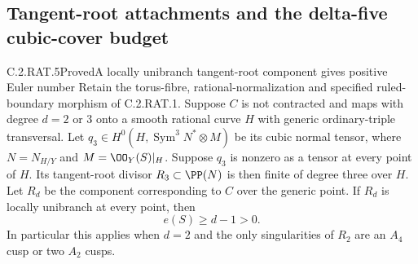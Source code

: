 \subsection{Tangent-root attachments and the delta-five cubic-cover budget}

\begin{statement}{C.2.RAT.5}{Proved}{A locally unibranch tangent-root component gives positive Euler number}
Retain the torus-fibre, rational-normalization and specified
ruled-boundary morphism of C.2.RAT.1. Suppose $C$ is not
contracted and maps with degree $d=2$ or $3$ onto a smooth
rational curve $H$ with generic ordinary-triple transversal.
Let $q_3\in H^0(H,\operatorname{Sym}^3N^*\otimes M)$ be
its cubic normal tensor, where $N=N_{H/Y}$ and
$M=\OO_Y(S)|_H$. Suppose $q_3$ is nonzero as a tensor at
every point of $H$. Its tangent-root divisor
$R_3\subset\PP(N)$ is then finite of degree three over $H$.
Let $R_d$ be the component corresponding to $C$ over the
generic point. If $R_d$ is locally unibranch at every point,
then
\[
                           e(S)\ge d-1>0.
\tag{C.RD.1}
\]
In particular this applies when $d=2$ and the only singularities
of $R_2$ are an $A_4$ cusp or two $A_2$ cusps.
\end{statement}
